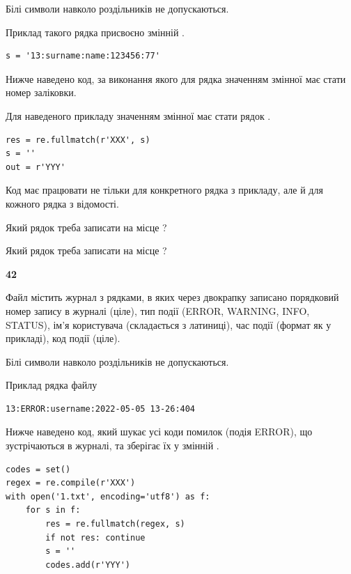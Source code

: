 Білі символи навколо роздільників не допускаються.

Приклад такого рядка присвоєно змінній .



\begin{verbatim}
s = '13:surname:name:123456:77'
\end{verbatim}


Нижче наведено код, за виконання якого для рядка  значенням змінної  має стати номер заліковки.

Для наведеного прикладу значенням змінної  має стати рядок  .



\begin{verbatim}
res = re.fullmatch(r'XXX', s)
s = ''
out = r'YYY'
\end{verbatim}


Код має працювати не тільки для конкретного рядка з прикладу, але й для кожного рядка з відомості.




Який рядок треба записати на місце  ?\par
\vspace{5mm}


Який рядок треба записати на місце  ?\par


\newpage

{\begin {center}\textbf{ 42}\end {center}}\par
Файл  містить журнал з рядками, в яких через двокрапку записано поряд\-ко\-вий номер запису в журналі (ціле), тип події (ERROR, WARNING, INFO, STATUS), ім'я користувача (складається з латиниці), час події (фор\-мат як у прикладі), код події (ціле).

Білі символи навколо роздільників не допускаються.

Приклад рядка файлу



\begin{verbatim}
13:ERROR:username:2022-05-05 13-26:404
\end{verbatim}


Нижче наведено код, який шукає усі коди помилок (подія ERROR), що зустріча\-ють\-ся в журналі, та зберігає їх у змінній .



\begin{verbatim}
codes = set()
regex = re.compile(r'XXX')
with open('1.txt', encoding='utf8') as f:
    for s in f:
        res = re.fullmatch(regex, s)
        if not res: continue
        s = ''
        codes.add(r'YYY')
\end{verbatim}





